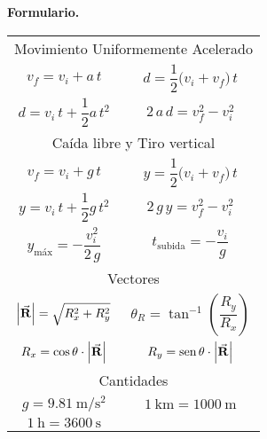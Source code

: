 \documentclass[12pt, letter]{exam}
\begin{document}
\textbf{\huge{Formulario.}}
\begin{table}[H]
    \centering
    \setlength{\tabcolsep}{40pt}
    \renewcommand{\arraystretch}{2.5}
    \begin{tabular}{c  c}
        \multicolumn{2}{c}{Movimiento Uniformemente Acelerado} \\
        $v_{f} = v_{i} + a \, t$ & $d = \dfrac{1}{2} \big( v_{i} + v_{f} \big) \, t$ \\
        $d = v_{i} \, t + \dfrac{1}{2} a \, t^{2}$ & $2 \, a \, d = v_{f}^{2} - v_{i}^{2}$ \\ \hline
        \multicolumn{2}{c}{Caída libre y Tiro vertical} \\
        $v_{f} = v_{i} + g \, t$ & $y = \dfrac{1}{2} \big( v_{i} + v_{f} \big) \, t$ \\
        $y = v_{i} \, t + \dfrac{1}{2} g \, t^{2}$ & $2 \, g \, y = v_{f}^{2} - v_{i}^{2}$ \\ 
        $y_{\text{máx}} = - \dfrac{v_{i}^{2}}{2 \, g}$ & $t_{\text{subida}} = - \dfrac{v_{i}}{g}$ \\ \hline
        \multicolumn{2}{c}{Vectores} \\
        $\abs{\va{R}} = \sqrt{R_{x}^{2} + R_{y}^{2}}$ & $\theta_{R} = \tan^{-1} \left( \dfrac{R_{y}}{R_{x}} \right)$ \\
        $R_{x} = \cos \theta \cdot \abs{\va{R}}$ & $R_{y} = \text{sen} \, \theta \cdot \abs{\va{R}}$ \\ \hline
        \multicolumn{2}{c}{Cantidades} \\
        $g = \SI{9.81}{\meter\per\square\second}$ & $\SI{1}{\kilo\meter} = \SI{1000}{\meter}$  \\
        $\SI{1}{\hour} = \SI{3600}{\second}$ &
\end{tabular}
\end{table}
\end{document}
